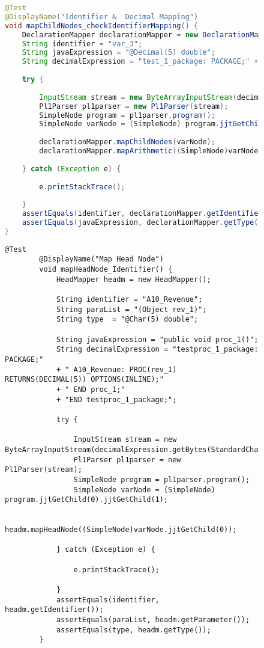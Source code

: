 

\begin{figure}[H]
\begin{lstlisting}[language=Java, caption=mapArithmetic Test, label={lst:pliarithmeticexpression_test}]
@Test
@DisplayName("Identifier &  Decimal Mapping")
void mapChildNodes_checkIdentifierMapping() {
	DeclarationMapper declarationMapper = new DeclarationMapper();
	String identifier = "var_3";
	String javaExpression = "@Decimal(5) double";
	String decimalExpression = "test_1_package: PACKAGE;" + "	DCL var_3 FIXED DECIMAL(5)" + "END test_1_package;";
	
	try {
		
		InputStream stream = new ByteArrayInputStream(decimalExpression.getBytes(StandardCharsets.UTF_8));
		Pl1Parser pl1parser = new Pl1Parser(stream);
		SimpleNode program = pl1parser.program();
		SimpleNode varNode = (SimpleNode) program.jjtGetChild(0).jjtGetChild(1);
		
		declarationMapper.mapChildNodes(varNode);
		declarationMapper.mapArithmetic((SimpleNode)varNode.jjtGetChild(1).jjtGetChild(0));
		
	} catch (Exception e) {
		
		e.printStackTrace();
		
	}
	assertEquals(identifier, declarationMapper.getIdentifier());
	assertEquals(javaExpression, declarationMapper.getType());
}		
\end{lstlisting}
\end{figure}


\begin{figure}[H]
	\begin{lstlisting}[language=PL/I, caption=mapHeadNode Test, label={lst:procchar_test}]
		@Test
		@DisplayName("Map Head Node")
		void mapHeadNode_Identifier() {
			HeadMapper headm = new HeadMapper();
			
			String identifier = "A10_Revenue";
			String paraList = "(Object rev_1)";
			String type  = "@Char(5) double";
			
			String javaExpression = "public void proc_1()";
			String decimalExpression = "testproc_1_package: PACKAGE;" 
			+ "	A10_Revenue: PROC(rev_1) RETURNS(DECIMAL(5)) OPTIONS(INLINE);"
			+ "	END proc_1;" 
			+ "END testproc_1_package;";
			
			try {
				
				InputStream stream = new ByteArrayInputStream(decimalExpression.getBytes(StandardCharsets.UTF_8));
				Pl1Parser pl1parser = new Pl1Parser(stream);
				SimpleNode program = pl1parser.program();
				SimpleNode varNode = (SimpleNode) program.jjtGetChild(0).jjtGetChild(1);
				
				headm.mapHeadNode((SimpleNode)varNode.jjtGetChild(0));
				
			} catch (Exception e) {
				
				e.printStackTrace();
				
			}
			assertEquals(identifier, headm.getIdentifier());
			assertEquals(paraList, headm.getParameter());
			assertEquals(type, headm.getType());
		}		
	\end{lstlisting}
\end{figure}

